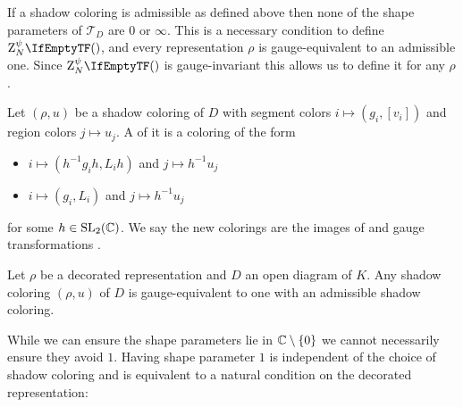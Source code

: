 \documentclass[margincite, leqno]{sl2art}
\numberwithin{equation}{section}
\begin{document}
If a shadow coloring is admissible as defined above then none of the
shape parameters of \(\mathcal{T}_{D}\) are \(0\) or \(\infty\).%
This is a necessary condition to define \(\qinv{}\), and every
representation \(\rho\) is gauge-equivalent to an admissible one.
Since \(\qinv{}\) is gauge-invariant this allows us to define it for
any \(\rho\).

\begin{definition}
  \label{def:gauge transformation}
  Let \((\rho, u)\) be a shadow coloring of \(D\) with segment colors
  \(i \mapsto (g_{i}, [v_{i}])\) and region colors \(j \mapsto u_{j}\).
  A  of it is a coloring of the form
  \begin{itemize}
    \item[(A)] \(i \mapsto (h^{-1} g_i h, L_i h)\) and \(j \mapsto h^{-1} u_j\)
    \item[(B)] \(i \mapsto (g_i, L_i)\) and \(j \mapsto h^{-1} u_j\)
  \end{itemize}
  for some \(h \in \operatorname{SL}_2(\mathbb{C})\).
  We say the new colorings are the images of  and
   gauge transformations  .
\end{definition}

\begin{lemma}
  Let \(\rho\) be a decorated representation and \(D\) an open diagram of \(K\).
  Any shadow coloring \((\rho, u)\) of \(D\) is gauge-equivalent to
  one with an admissible shadow coloring.
\end{lemma}

While we can ensure the shape parameters lie in \(\mathbb{C}\setminus
\set{0}\) we cannot necessarily ensure they avoid \(1\).
Having shape parameter \(1\) is independent of the choice of shadow
coloring and is equivalent to a natural condition on the decorated
representation:
\end{document}
